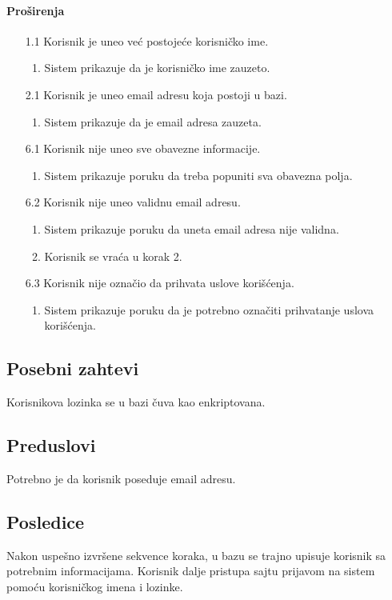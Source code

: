\documentclass[a4paper,12pt]{report}
\begin{document}
    \paragraph*{Proširenja} 
    \begin{enumerate}
        \item[1.1] Korisnik je uneo već postojeće korisničko ime.
            \begin{enumerate}[noitemsep,topsep=-8pt]
                \item Sistem prikazuje da je korisničko ime zauzeto.
            \end{enumerate}
   
        \item[2.1] Korisnik je uneo email adresu koja postoji u bazi.
        \begin{enumerate}[noitemsep,topsep=-8pt]
            \item Sistem prikazuje da je email adresa zauzeta.
        \end{enumerate}
    
        \item[6.1] Korisnik nije uneo sve obavezne informacije.
            \begin{enumerate}[noitemsep,topsep=-8pt]
                \item Sistem prikazuje poruku da treba popuniti sva obavezna polja.
            \end{enumerate}
 
        \item[6.2] Korisnik nije uneo validnu email adresu.
             \begin{enumerate}[noitemsep,topsep=-8pt]
                \item Sistem prikazuje poruku da uneta email adresa nije validna.
                \item Korisnik se vraća u korak 2.
            \end{enumerate}
        \item[6.3] Korisnik nije označio da prihvata uslove korišćenja.
         \begin{enumerate}[noitemsep,topsep=-8pt]
            \item Sistem prikazuje poruku da je potrebno označiti prihvatanje uslova korišćenja.
        \end{enumerate}
    \end{enumerate}
    
\subsection{Posebni zahtevi}
    Korisnikova lozinka se u bazi čuva kao enkriptovana.
\subsection{Preduslovi}
    Potrebno je da korisnik poseduje email adresu. 
\subsection{Posledice}
    Nakon uspešno izvršene sekvence koraka, u bazu se trajno upisuje korisnik sa potrebnim informacijama. Korisnik dalje pristupa sajtu prijavom na sistem pomoću korisničkog imena i lozinke.
\end{document}

